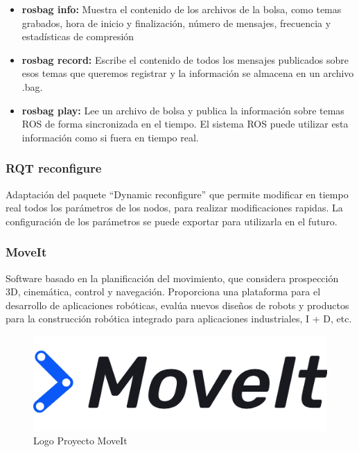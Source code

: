                     \begin{itemize}
                        \item{\textbf{rosbag info:} Muestra el contenido de los archivos de la bolsa, como temas grabados, hora de inicio y finalización, número de mensajes, frecuencia y estadísticas de compresión} 
                        \item{\textbf{rosbag record:} Escribe el contenido de todos los mensajes publicados sobre esos temas que queremos registrar y la información se almacena en un archivo .bag.} 
                        \item{\textbf{rosbag play: } Lee un archivo de bolsa y publica la información sobre temas ROS de forma sincronizada en el tiempo. El sistema ROS puede utilizar esta información como si fuera en tiempo real.} 
                    \end{itemize}

            \subsubsection{RQT reconfigure}
Adaptación del paquete “Dynamic reconfigure” que permite modificar en tiempo real todos los parámetros de los nodos, para realizar modificaciones rapidas. La configuración de los parámetros se puede exportar para utilizarla en el futuro.

            \subsubsection{MoveIt }
 Software basado en la planificación del movimiento, que considera prospección 3D, cinemática, control y navegación. Proporciona una plataforma para el desarrollo de aplicaciones robóticas, evalúa nuevos diseños de robots y productos para la construcción robótica integrado para aplicaciones industriales, I + D, etc.
 
             \begin{figure}[htb]
                \centering
                \includegraphics[width=0.8\linewidth]{Main/Chapter3/Images3/herramientas_2.png}
                \caption{Logo Proyecto MoveIt}
                \label{f:Cap3_herramientas_2}
            \end{figure}     
            
